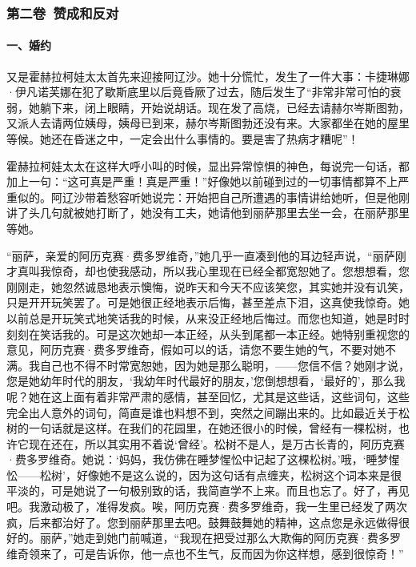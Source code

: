 \subsubsection*{第二卷\ 赞成和反对}

\paragraph*{一、婚约}
\par 又是霍赫拉柯娃太太首先来迎接阿辽沙。她十分慌忙，发生了一件大事：卡捷琳娜·伊凡诺芙娜在犯了歇斯底里以后竟昏厥了过去，随后发生了“非常非常可怕的衰弱，她躺下来，闭上眼睛，开始说胡话。现在发了高烧，已经去请赫尔岑斯图勃，又派人去请两位姨母，姨母已到来，赫尔岑斯图勃还没有来。大家都坐在她的屋里等候。她还在昏迷之中，一定会出什么事情的。要是害了热病才糟呢”！
\par 霍赫拉柯娃太太在这样大呼小叫的时候，显出异常惊惧的神色，每说完一句话，都加上一句：“这可真是严重！真是严重！”好像她以前碰到过的一切事情都算不上严重似的。阿辽沙带着愁容听她说完：开始把自己所遭遇的事情讲给她听，但是他刚讲了头几句就被她打断了，她没有工夫，她请他到丽萨那里去坐一会，在丽萨那里等她。
\par “丽萨，亲爱的阿历克赛·费多罗维奇，”她几乎一直凑到他的耳边轻声说，“丽萨刚才真叫我惊奇，却也使我感动，所以我心里现在已经全都宽恕她了。您想想看，您刚刚走，她忽然诚恳地表示懊悔，说昨天和今天不应该笑您，其实她并没有讥笑，只是开开玩笑罢了。可是她很正经地表示后悔，甚至差点下泪，这真使我惊奇。她以前总是开玩笑式地笑话我的时候，从来没正经地后悔过。而您也知道，她是时时刻刻在笑话我的。可是这次她却一本正经，从头到尾都一本正经。她特别重视您的意见，阿历克赛·费多罗维奇，假如可以的话，请您不要生她的气，不要对她不满。我自己也不得不时常宽恕她，因为她是那么聪明，——您信不信？她刚才说，您是她幼年时代的朋友，‘我幼年时代最好的朋友，’您倒想想看，‘最好的’，那么我呢？她在这上面有着非常严肃的感情，甚至回忆，尤其是这些话，这些词句，这些完全出人意外的词句，简直是谁也料想不到，突然之间蹦出来的。比如最近关于松树的一句话就是这样。在我们的花园里，在她还很小的时候，曾经有一棵松树，也许它现在还在，所以其实用不着说‘曾经’。松树不是人，是万古长青的，阿历克赛·费多罗维奇。她说：‘妈妈，我仿佛在睡梦惺忪中记起了这棵松树。’哦，‘睡梦惺忪——松树’，好像她不是这么说的，因为这句话有点缠夹，松树这个词本来是很平淡的，可是她说了一句极别致的话，我简直学不上来。而且也忘了。好了，再见吧。我激动极了，准得发疯。唉，阿历克赛·费多罗维奇，我一生里已经发了两次疯，后来都治好了。您到丽萨那里去吧。鼓舞鼓舞她的精神，这点您是永远做得很好的。丽萨，”她走到她门前喊道，“我现在把受过那么大欺侮的阿历克赛·费多罗维奇领来了，可是告诉你，他一点也不生气，反而因为你这样想，感到很惊奇！”
